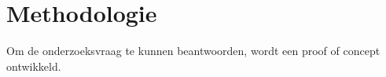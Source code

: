 \section{Methodologie}
\label{sec:methodologie}

Om de onderzoeksvraag te kunnen beantwoorden, wordt een proof of concept ontwikkeld.






